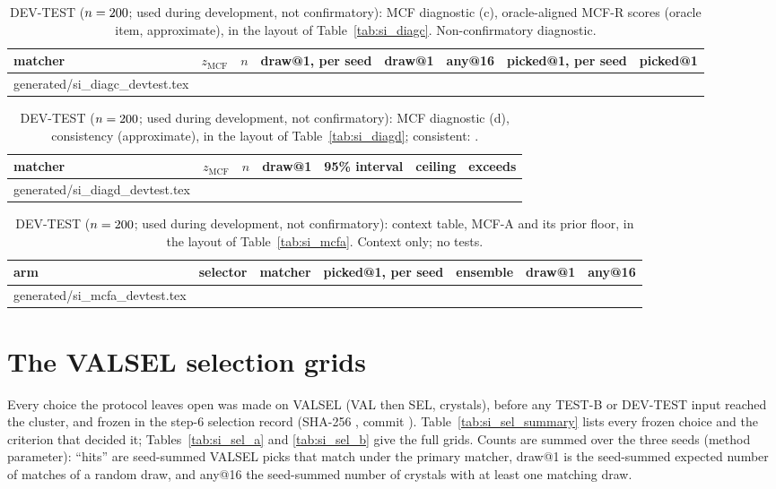 \documentclass[journal=acsodf,manuscript=article]{achemso}
\makeatletter
\newcommand{\inputrows}[1]{\@@input #1 }
\newcommand{\devlabel}{DEV-TEST ($n=\svNDev$; used during development, not confirmatory)}
\makeatother
\begin{document}
\begin{table}[htbp]
\caption{\devlabel: MCF diagnostic (c), oracle-aligned MCF-R scores (oracle item, approximate),
in the layout of Table~\ref{tab:si_diagc}. Non-confirmatory diagnostic.}
\label{tab:si_dev_diagc}
\centering
\footnotesize
\setlength{\tabcolsep}{3pt}
\begin{tabular}{@{}lcrccccc@{}}
\toprule
matcher & $z_\mathrm{MCF}$ & $n$ & draw@1, per seed & draw@1 & any@16 & picked@1, per seed & picked@1 \\
\midrule
\inputrows{generated/si_diagc_devtest.tex}
\bottomrule
\end{tabular}
\end{table}

\begin{table}[htbp]
\caption{\devlabel: MCF diagnostic (d), consistency (approximate), in the layout of
Table~\ref{tab:si_diagd}; consistent: \svDiagDConsistentDev.}
\label{tab:si_dev_diagd}
\centering
\small
\begin{tabular}{@{}lcrcccc@{}}
\toprule
matcher & $z_\mathrm{MCF}$ & $n$ & draw@1 & 95\% interval & ceiling & exceeds \\
\midrule
\inputrows{generated/si_diagd_devtest.tex}
\bottomrule
\end{tabular}
\end{table}

\begin{table}[htbp]
\caption{\devlabel: context table, MCF-A and its prior floor, in the layout of
Table~\ref{tab:si_mcfa}. Context only; no tests.}
\label{tab:si_dev_mcfa}
\centering
\footnotesize
\setlength{\tabcolsep}{3pt}
\begin{tabular}{@{}lllcccc@{}}
\toprule
arm & selector & matcher & picked@1, per seed & ensemble & draw@1 & any@16 \\
\midrule
\inputrows{generated/si_mcfa_devtest.tex}
\bottomrule
\end{tabular}
\end{table}

\clearpage
\section{The VALSEL selection grids}\label{si:valsel}
Every choice the protocol leaves open was made on VALSEL (VAL then SEL, \svValselN{} crystals),
before any TEST-B or DEV-TEST input reached the cluster, and frozen in the step-6 selection
record (SHA-256 \svSelSha, commit \svSelCommit). Table~\ref{tab:si_sel_summary} lists every
frozen choice and the criterion that decided it; Tables~\ref{tab:si_sel_a} and
\ref{tab:si_sel_b} give the full grids. Counts are summed over the three seeds (method
parameter): ``hits'' are seed-summed VALSEL picks that match under the primary matcher, draw@1
is the seed-summed expected number of matches of a random draw, and any@16 the seed-summed
number of crystals with at least one matching draw.
\end{document}
